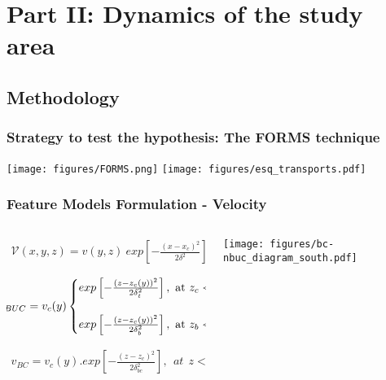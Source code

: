 \documentclass{beamer}
\begin{document}
\section{Part II: Dynamics of the study area}

\subsection{Methodology}

\frame
{
  \frametitle{Strategy to test the hypothesis: The FORMS technique}
\texttt{[image: figures/FORMS.png]}\hspace{0.5cm}
\texttt{[image: figures/esq\_transports.pdf]}
}

\frame
{
  \frametitle{Feature Models Formulation - Velocity}

\begin{columns}
  \begin{column}{6cm}

\begin{footnotesize}
\begin{eqnarray*}
    \mathcal{V}(x,y,z) = v(y,z)\ exp \left[- \frac{(x-x_c)^2}{2 \delta^2} \right],
    \label{eq:main}
\end{eqnarray*}


\begin{eqnarray*}
    \label{eq:nbuc_alongstream}
    \hspace{-0.5cm} v_{NBUC} = v_c(y) 
    \begin{cases} 
        exp \left[ - \frac{(z-z_c(y))^2}{2\delta_t^2} \right], \  \text{at}  \ z_c < z < 0 \\
        \ \\
        exp \left[ - \frac{(z-z_c(y))^2}{2\delta_b^2} \right], \  \text{at}  \ z_b < z < z_c \\
    \end{cases}
\end{eqnarray*}

\begin{eqnarray*}
    v_{BC} = v_c(y) . exp \left[ - \frac{(z-z_c)^2}{2\delta_{bc}^2} \right], \ \ at \ \ z < 0
    \label{eq:bc_alongstream}
\end{eqnarray*}

\end{footnotesize}

  \end{column}

  \begin{column}{5cm}
    \texttt{[image: figures/bc-nbuc\_diagram\_south.pdf]}
  \end{column}

\end{columns}
}
\end{document}

